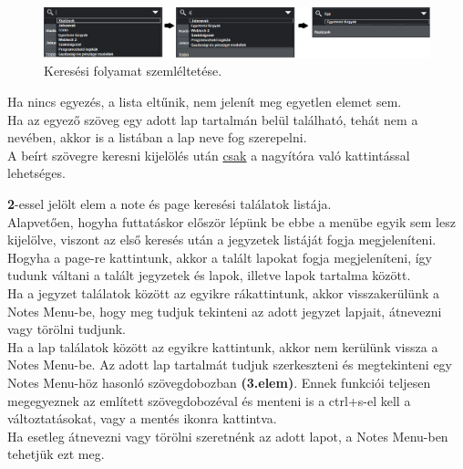 \begin{figure}[h]
	\centering
	\includegraphics[scale=0.7]{images/doc_5.png}
	\caption{Keresési folyamat szemléltetése.}
	\label{fig:menu_search_searchBar}
\end{figure}
	
\vspace{5pt} \noindent Ha nincs egyezés, a lista eltűnik, nem jelenít meg egyetlen elemet sem.
\vspace{5pt} \\Ha az egyező szöveg egy adott lap tartalmán belül található, tehát nem a nevében, akkor is a listában a lap neve fog szerepelni.
\vspace{5pt} \\A beírt szövegre keresni kijelölés után \underline{csak} a nagyítóra való kattintással lehetséges.
	
	
\vspace{5pt} \noindent \textbf{2}-essel jelölt elem a note és page keresési találatok listája.
\vspace{5pt} \\Alapvetően, hogyha futtatáskor először lépünk be ebbe a menübe egyik sem lesz kijelölve, viszont az első keresés után a jegyzetek listáját fogja megjeleníteni. Hogyha a page-re kattintunk, akkor a talált lapokat fogja megjeleníteni, így tudunk váltani a talált jegyzetek és lapok, illetve lapok tartalma között.
\vspace{5pt} \\Ha a jegyzet találatok között az egyikre rákattintunk, akkor visszakerülünk a Notes Menu-be, hogy meg tudjuk tekinteni az adott jegyzet lapjait, átnevezni vagy törölni tudjunk.
\vspace{5pt} \\Ha a lap találatok között az egyikre kattintunk, akkor nem kerülünk vissza a Notes Menu-be. Az adott lap tartalmát tudjuk szerkeszteni és megtekinteni egy Notes Menu-höz hasonló szövegdobozban \textbf{(3.elem)}. Ennek funkciói teljesen megegyeznek az említett szövegdobozéval és menteni is a ctrl+s-el kell a változtatásokat, vagy a mentés ikonra kattintva.
\vspace{5pt} \\Ha esetleg átnevezni vagy törölni szeretnénk az adott lapot, a Notes Menu-ben tehetjük ezt meg.

